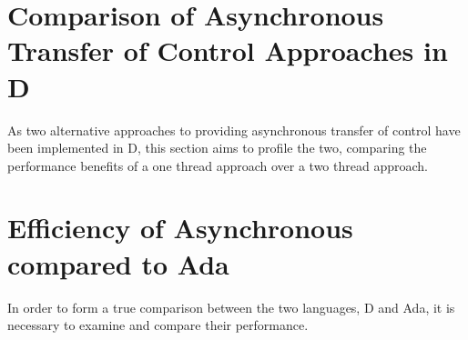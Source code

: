 \section{Comparison of Asynchronous Transfer of Control Approaches in D}
As two alternative approaches to providing asynchronous transfer of control
have been implemented in D, this section aims to profile the two, comparing the
performance benefits of a one thread approach over a two thread approach. 

\section{Efficiency of Asynchronous compared to Ada}
In order to form a true comparison between the two languages, D and Ada, it is
necessary to examine and compare their performance.



